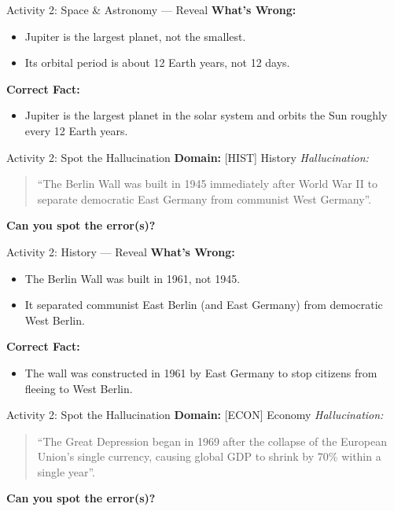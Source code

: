 \documentclass{beamer}
\begin{document}
\begin{frame}{Activity 2: Space \& Astronomy — Reveal}
    	\textbf{What’s Wrong:}
    \begin{itemize}
        \item Jupiter is the largest planet, not the smallest.
        \item Its orbital period is about 12 Earth years, not 12 days.
    \end{itemize}
    	\textbf{Correct Fact:}
    \begin{itemize}
        \item Jupiter is the largest planet in the solar system and orbits the Sun roughly every 12 Earth years.
    \end{itemize}
\end{frame}

\begin{frame}{Activity 2: Spot the Hallucination}
    	\textbf{Domain:} [HIST] History
    \vspace{0.3cm}
    	\textit{Hallucination:}
    \begin{quote}
        ``The Berlin Wall was built in 1945 immediately after World War II to separate democratic East Germany from communist West Germany''.
    \end{quote}
    \vspace{0.3cm}
    	\textbf{Can you spot the error(s)?}
\end{frame}

\begin{frame}{Activity 2: History — Reveal}
    	\textbf{What’s Wrong:}
    \begin{itemize}
        \item The Berlin Wall was built in 1961, not 1945.
        \item It separated communist East Berlin (and East Germany) from democratic West Berlin.
    \end{itemize}
    	\textbf{Correct Fact:}
    \begin{itemize}
        \item The wall was constructed in 1961 by East Germany to stop citizens from fleeing to West Berlin.
    \end{itemize}
\end{frame}

\begin{frame}{Activity 2: Spot the Hallucination}
    	\textbf{Domain:} [ECON] Economy
    \vspace{0.3cm}
    	\textit{Hallucination:}
    \begin{quote}
        ``The Great Depression began in 1969 after the collapse of the European Union’s single currency, causing global GDP to shrink by 70\% within a single year''.
    \end{quote}
    \vspace{0.3cm}
    	\textbf{Can you spot the error(s)?}
\end{frame}
\end{document}
